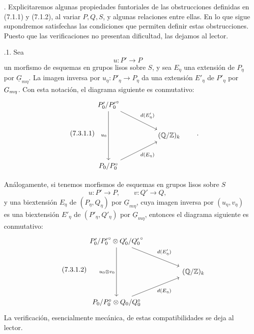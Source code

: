 
\medskip
{}. Explicitaremos algunas propiedades funtoriales de las
obstrucciones definidas en (7.1.1) y (7.1.2), al variar $P,Q,S$, y
algunas relaciones entre ellas. En lo que sigue supondremos satisfechas
las condiciones que permiten definir estas obstrucciones. Puesto que
las verificaciones no presentan dificultad, las dejamos al lector.

\medskip
{}.1. Sea
\[
 u:P'\longrightarrow P
\]
un morfismo de esquemas en grupos lisos sobre $S$, y sea $E_\eta$ una
extensión de $P_\eta$ por $\underline G_{m\eta}$. La imagen inversa por
$u_\eta:P'_\eta\to P_\eta$ da una extensión $E'_\eta$ de $P'_\eta$ por
$\underline G_{\sisi{m}{m\eta}}$. Con esta notación, el diagrama
siguiente es conmutativo:
\begin{equation}\tag{7.3.1.1}
\begin{tikzcd}[row sep=large,column sep=huge]
 P'_0/{P'_0}^{\circ}
   \arrow[dd,"u_0"']
   \arrow[rd,"d(E'_\eta)"] & \\
 & (\mathbb Q/\mathbb Z)_k \\
 P_0/P_0^{\circ}
   \arrow[ru,"d(E_\eta)"'] &
\end{tikzcd}
\qquad .
\end{equation}


Análogamente, si tenemos morfismos de esquemas en grupos lisos sobre
$S$
\[
 u:P'\longrightarrow P,
 \qquad
 v:Q'\longrightarrow Q,
\]
y una biextensión $E_\eta$ de $(P_\eta,Q_\eta)$ por
$\underline G_{m\eta}$, cuya imagen inversa por $(u_\eta,v_\eta)$ es
una biextensión $E'_\eta$ de $(P'_\eta,Q'_\eta)$ por
$\underline G_{m\eta}$, entonces el diagrama siguiente es conmutativo:
\begin{equation}\tag{7.3.1.2}
\begin{tikzcd}[row sep=large,column sep=huge]
 P'_0/{P'_0}^{\circ}\otimes Q'_0/{Q'_0}^{\circ}
   \arrow[dd,"u_0\otimes v_0"']
   \arrow[rd,"d(E'_\eta)"] & \\
 & (\mathbb Q/\mathbb Z)_k \\
 P_0/P_0^{\circ}\otimes Q_0/Q_0^{\circ}
   \arrow[ru,"d(E_\eta)"'] &
\end{tikzcd}
\end{equation}
La verificación, esencialmente mecánica, de estas compatibilidades se
deja al lector.
